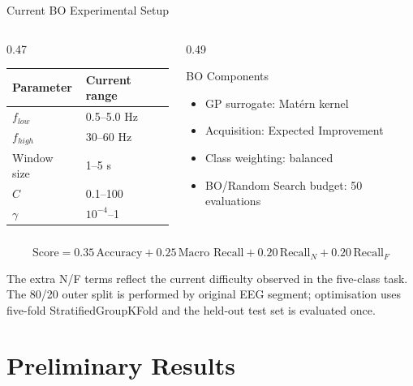 \documentclass{beamer}
\begin{document}
\begin{frame}{Current BO Experimental Setup}
  \begin{columns}[T]
    \begin{column}{0.47\textwidth}
      \begin{table}
        \centering
        \scriptsize
        \begin{tabular}{ll}
          \toprule
          Parameter & Current range \\
          \midrule
          $f_{low}$ & 0.5--5.0 Hz \\
          $f_{high}$ & 30--60 Hz \\
          Window size & 1--5 s \\
          $C$ & 0.1--100 \\
          $\gamma$ & $10^{-4}$--1 \\
          \bottomrule
        \end{tabular}
      \end{table}
    \end{column}

    \begin{column}{0.49\textwidth}
      \begin{block}{BO Components}
        \begin{itemize}
          \item GP surrogate: Mat\'ern kernel
          \item Acquisition: Expected Improvement
          \item Class weighting: balanced
          \item BO/Random Search budget: 50 evaluations
        \end{itemize}
      \end{block}
    \end{column}
  \end{columns}

  \[
    \text{Score} =
    0.35\,\text{Accuracy}
    +0.25\,\text{Macro Recall}
    +0.20\,\text{Recall}_{N}
    +0.20\,\text{Recall}_{F}
  \]

  \scriptsize The extra N/F terms reflect the current difficulty observed in the five-class task.
  The 80/20 outer split is performed by original EEG segment; optimisation
  uses five-fold StratifiedGroupKFold and the held-out test set is evaluated once.
\end{frame}

\section{Preliminary Results}
\end{document}
